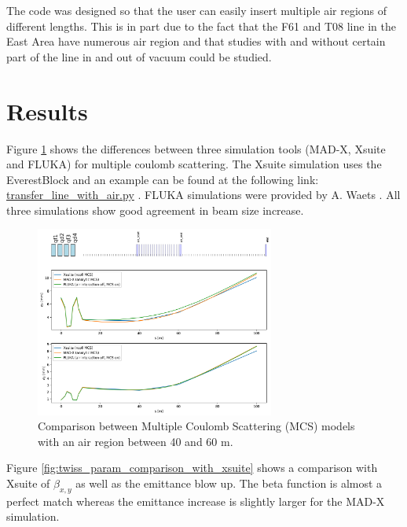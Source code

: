 \documentclass{cernatsnote}
\begin{document}
The code was designed so that the user can easily insert multiple air regions of different lengths. This is in part due to the fact that the F61 and T08 line in the East Area have numerous air region and that studies with and without certain part of the line in and out of vacuum could be studied.

\section{Results}

Figure \ref{fig:comparison_sim} shows the differences between three simulation tools (MAD-X, Xsuite and FLUKA) for multiple coulomb scattering. The Xsuite simulation uses the EverestBlock and an example can be found at the following link: \href{https://github.com/xsuite/xcoll/blob/main/examples/transfer_line_with_air.py}{transfer\_line\_with\_air.py} \cite{iadarola_xsuite_2023}. FLUKA simulations were provided by A. Waets \cite{ahdida_new_2022-1, battistoni_overview_2015}. All three simulations show good agreement in beam size increase.

\begin{figure}[!htb]
\centering
\includegraphics[width=0.7\textwidth]{images/compare_simulation_MCS.png}
\caption{Comparison between Multiple Coulomb Scattering (MCS) models with an air region between 40 and 60 m.}
\label{fig:comparison_sim}
\end{figure}

\newpage
Figure \ref{fig:twiss_param_comparison_with_xsuite} shows a comparison with Xsuite of $\beta_{x,y}$ as well as the emittance blow up. The beta function is almost a perfect match whereas the emittance increase is slightly larger for the MAD-X simulation.
\end{document}
